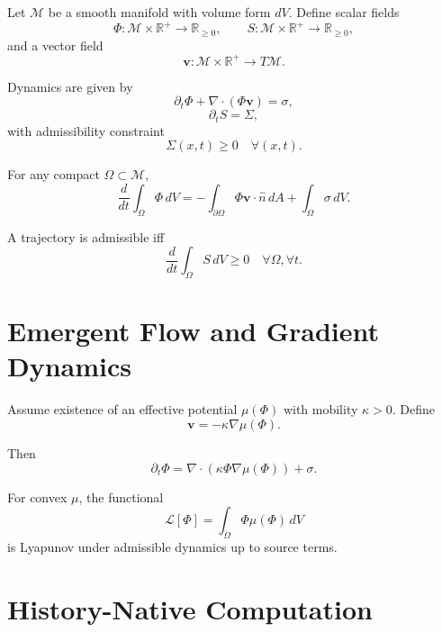 \documentclass[12pt,oneside]{book}
\begin{document}
Let \(\mathcal{M}\) be a smooth manifold with volume form \(dV\).
Define scalar fields
\[
\Phi : \mathcal{M} \times \mathbb{R}^+ \to \mathbb{R}_{\ge 0},
\qquad
S : \mathcal{M} \times \mathbb{R}^+ \to \mathbb{R}_{\ge 0},
\]
and a vector field
\[
\mathbf{v} : \mathcal{M} \times \mathbb{R}^+ \to T\mathcal{M}.
\]

Dynamics are given by
\begin{equation}
\partial_t \Phi + \nabla \cdot (\Phi \mathbf{v}) = \sigma,
\end{equation}
\begin{equation}
\partial_t S = \Sigma,
\end{equation}
with admissibility constraint
\begin{equation}
\Sigma(x,t) \ge 0 \quad \forall (x,t).
\end{equation}

For any compact \(\Omega \subset \mathcal{M}\),
\begin{equation}
\frac{d}{dt}\int_\Omega \Phi\, dV
=
-\int_{\partial \Omega} \Phi \mathbf{v}\cdot \hat{n}\, dA
+
\int_\Omega \sigma\, dV.
\end{equation}

A trajectory is admissible iff
\begin{equation}
\frac{d}{dt}\int_\Omega S\, dV \ge 0
\quad \forall \Omega, \forall t.
\end{equation}

\chapter{Emergent Flow and Gradient Dynamics}

Assume existence of an effective potential \(\mu(\Phi)\) with mobility \(\kappa>0\).
Define
\begin{equation}
\mathbf{v} = -\kappa \nabla \mu(\Phi).
\end{equation}

Then
\begin{equation}
\partial_t \Phi = \nabla \cdot \left(\kappa \Phi \nabla \mu(\Phi)\right) + \sigma.
\end{equation}

For convex \(\mu\), the functional
\begin{equation}
\mathcal{L}[\Phi] = \int_\Omega \Phi \mu(\Phi)\, dV
\end{equation}
is Lyapunov under admissible dynamics up to source terms.

\chapter{History-Native Computation}
\end{document}
